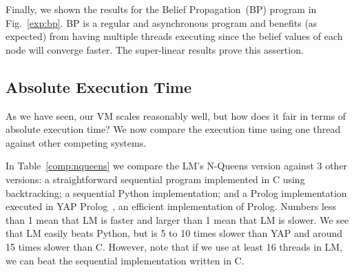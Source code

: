 Finally, we shown the results for the Belief Propagation~(BP) program in Fig.~\ref{exp:bp}. BP is a regular and asynchronous program
and benefits (as expected) from having multiple threads executing since the belief values of each node will converge faster.
The super-linear results prove this assertion.

\subsection{Absolute Execution Time}

As we have seen, our VM scales reasonably well, but how does it fair in terms of absolute execution time? We now compare the execution
time using one thread against other competing systems.

In Table~\ref{comp:nqueens} we compare the LM's N-Queens version against 3 other versions: a straightforward sequential program implemented
in C using backtracking; a sequential Python\cite{vanRossum:1995:PRM} implementation; and a Prolog implementation executed in
YAP Prolog~\cite{DBLP:journals/corr/abs-1102-3896}, an efficient implementation of Prolog. Numbers less than 1 mean that LM
is faster and larger than 1 mean that LM is slower. We see that LM easily beats Python, but is 5 to 10 times slower than YAP
and around 15 times slower than C.
However, note that if we use at least 16 threads in LM, we can beat the sequential implementation written in C.

